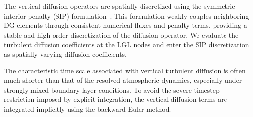 The vertical diffusion operators are spatially discretized using the symmetric interior penalty (SIP) formulation~\citep{Arnold2002}.
This formulation weakly couples neighboring DG elements through consistent numerical fluxes and penalty terms, 
providing a stable and high-order discretization of the diffusion operator.
We evaluate the turbulent diffusion coefficients at the LGL nodes and enter the SIP discretization as spatially varying diffusion coefficients.


The characteristic time scale associated with vertical turbulent diffusion is often much shorter than that of the resolved atmospheric dynamics, especially under strongly mixed boundary-layer conditions.
To avoid the severe timestep restriction imposed by explicit integration, 
the vertical diffusion terms are integrated implicitly using the backward Euler method. 
